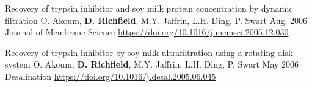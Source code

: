 \documentclass[%
               doublesided,
               paper=a4,
               fontsize=10pt
              ]{my-resume}
\begin{document}
{\publication
	{Recovery of trypsin inhibitor and soy milk protein concentration by dynamic filtration} %
	{O. Akoum, \textbf{D. Richfield}, M.Y. Jaffrin, L.H. Ding, P. Swart } %
	{Aug. 2006} %
	{Journal of Membrane Science} %
	{\href{https://doi.org/10.1016/j.memsci.2005.12.030}{https://doi.org/10.1016/j.memsci.2005.12.030}} %

\publication
	{Recovery of trypsin inhibitor by soy milk ultrafiltration using a rotating disk system} %
	{O. Akoum, \textbf{D. Richfield}, M.Y. Jaffrin, L.H. Ding, P. Swart } %
	{May 2006} %
	{Desalination} %
	{\href{https://doi.org/10.1016/j.desal.2005.06.045}{https://doi.org/10.1016/j.desal.2005.06.045}} %

}
\makebody


\clearpage
\end{document}
